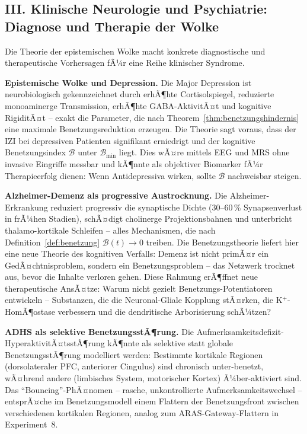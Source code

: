 ﻿\documentclass[12pt,a4paper]{report}
\theoremstyle{plain}
\theoremstyle{definition}
\theoremstyle{remark}
\begin{document}
	\subsection*{III. Klinische Neurologie und Psychiatrie:
		Diagnose und Therapie der Wolke}

	Die Theorie der epistemischen Wolke macht konkrete diagnostische
	und therapeutische Vorhersagen fÃ¼r eine Reihe klinischer Syndrome.

	\textbf{Epistemische Wolke und Depression.}
	Die Major Depression ist neurobiologisch gekennzeichnet durch
	erhÃ¶hte Cortisolspiegel, reduzierte monoaminerge Transmission,
	erhÃ¶hte GABA-AktivitÃ¤t und kognitive RigiditÃ¤t --
	exakt die Parameter, die nach Theorem~\ref{thm:benetzungshindernis}
	eine maximale Benetzungsreduktion erzeugen.
	Die Theorie sagt voraus, dass der IZI bei depressiven Patienten
	signifikant erniedrigt und der kognitive Benetzungsindex $\mathcal{B}$
	unter $\mathcal{B}_{\min}$ liegt.
	Dies wÃ¤re mittels EEG und MRS ohne invasive Eingriffe messbar
	und kÃ¶nnte als objektiver Biomarker fÃ¼r Therapieerfolg dienen:
	Wenn Antidepressiva wirken, sollte $\mathcal{B}$ nachweisbar steigen.

	\textbf{Alzheimer-Demenz als progressive Austrocknung.}
	Die Alzheimer-Erkrankung reduziert progressiv die synaptische Dichte
	(30--60\,\% Synapsenverlust in frÃ¼hen Stadien), schÃ¤digt
	cholinerge Projektionsbahnen und unterbricht thalamo-kortikale
	Schleifen -- alles Mechanismen, die nach Definition~\ref{def:benetzung}
	$\mathcal{B}(t) \to 0$ treiben.
	Die Benetzungstheorie liefert hier eine neue Theorie des
	kognitiven Verfalls: Demenz ist nicht primÃ¤r ein GedÃ¤chtnisproblem,
	sondern ein Benetzungsproblem -- das Netzwerk trocknet aus,
	bevor die Inhalte verloren gehen.
	Diese Rahmung erÃ¶ffnet neue therapeutische AnsÃ¤tze:
	Warum nicht gezielt Benetzungs-Potentiatoren entwickeln --
	Substanzen, die die Neuronal-Gliale Kopplung stÃ¤rken,
	die K$^+$-HomÃ¶ostase verbessern und die dendritische
	Arborisierung schÃ¼tzen?

	\textbf{ADHS als selektive BenetzungsstÃ¶rung.}
	Die Aufmerksamkeitsdefizit-HyperaktivitÃ¤ts\-stÃ¶rung kÃ¶nnte
	als selektive statt globale BenetzungsstÃ¶rung modelliert werden:
	Bestimmte kortikale Regionen (dorsolateraler PFC, anteriorer Cingulus)
	sind chronisch unter-benetzt, wÃ¤hrend andere (limbisches System,
	motorischer Kortex) Ã¼ber-aktiviert sind.
	Das ``Bouncing''-PhÃ¤nomen -- rasche, unkontrollierte Aufmerksamkeitswechsel --
	entsprÃ¤che im Benetzungsmodell einem Flattern der Benetzungsfront
	zwischen verschiedenen kortikalen Regionen, analog zum
	ARAS-Gateway-Flattern in Experiment~8.
\end{document}
